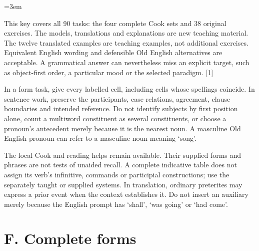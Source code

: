 \newcommand{\runningtitle}{Unit 13. Answer key}

\emergencystretch=3em
\newcommand{\itempara}[2]{\par\addvspace{3pt}\noindent\hangindent=1.8em\hangafter=1\makebox[1.8em][l]{#1.}#2\par}
\newcommand{\reserve}[1]{\par\penalty-100\begingroup\dimen0=\pagegoal\advance\dimen0 by-\pagetotal\ifdim\dimen0<#1\newpage\fi\endgroup}

\raggedright
{}

This key covers all 90 tasks: the four complete Cook sets and 38 original exercises. The models, translations and explanations are new teaching material. The twelve translated examples are teaching examples, not additional exercises. Equivalent English wording and defensible Old English alternatives are acceptable. A grammatical answer can nevertheless miss an explicit target, such as object-first order, a particular mood or the selected paradigm. [1]

In a form task, give every labelled cell, including cells whose spellings coincide. In sentence work, preserve the participants, case relations, agreement, clause boundaries and intended reference. Do not identify subjects by first position alone, count a multiword constituent as several constituents, or choose a pronoun’s antecedent merely because it is the nearest noun. A masculine Old English pronoun can refer to a masculine noun meaning ‘song’.

The local Cook and reading helps remain available. Their supplied forms and phrases are not tests of unaided recall. A complete indicative table does not assign its verb’s infinitive, commands or participial constructions; use the separately taught or supplied systems. In translation, ordinary preterites may express a prior event when the context establishes it. Do not insert an auxiliary merely because the English prompt has ‘shall’, ‘was going’ or ‘had come’.

\clearpage
\section*{F. Complete forms}

